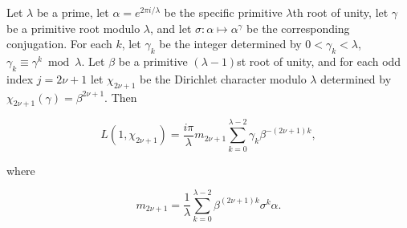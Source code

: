 Let $\lambda$ be a prime, let $\alpha = e^{2\pi i/\lambda}$ be the specific primitive $\lambda$th root of unity, let $\gamma$ be a primitive root modulo $\lambda$, and let $\sigma : \alpha \mapsto \alpha^\gamma$ be the corresponding conjugation. For each $k$, let $\gamma_k$ be the integer determined by $0 < \gamma_k < \lambda$, $\gamma_k \equiv \gamma^k \bmod \lambda$. Let $\beta$ be a primitive $(\lambda-1)$st root of unity, and for each odd index $j = 2\nu+1$ let $\chi_{2\nu+1}$ be the Dirichlet character modulo $\lambda$ determined by $\chi_{2\nu+1}(\gamma) = \beta^{2\nu+1}$. Then

$$L(1, \chi_{2\nu+1}) = \frac{i\pi}{\lambda} m_{2\nu+1} \sum_{k=0}^{\lambda-2} \gamma_k \beta^{-(2\nu+1)k},$$

where

$$m_{2\nu+1} = \frac{1}{\lambda} \sum_{k=0}^{\lambda-2} \beta^{(2\nu+1)k} \sigma^k \alpha.$$
